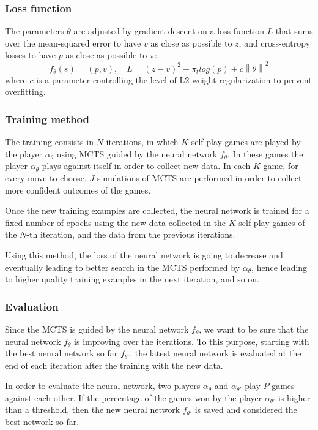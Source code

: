 \documentclass{article}
\newcommand{\norm}[1]{\left\lVert#1\right\rVert}
\begin{document}
\subsubsection{Loss function}
The parameters $\theta$ are adjusted by gradient descent on a loss function $L$ that sums over the mean-squared error to have $v$ as close as possible to $z$, and cross-entropy losses to have $p$ as close as possible to $\pi$:
\begin{equation}\label{eq:loss_function_alphazero}
	f_\theta(s) = (p,v),\quad L = (z-v)^2 - \pi_t log(p) + c \norm{\theta}^2
\end{equation}
where $c$ is a parameter controlling the level of L2 weight regularization to prevent overfitting.

\subsubsection{Training method} \label{sec:training}
The training consists in $N$ iterations, in which $K$ self-play games are played by the player $\alpha_\theta$ using MCTS guided by the neural network $f_\theta$. In these games the player $\alpha_\theta$ plays against itself in order to collect new data. In each $K$ game, for every move to choose, $J$ simulations of MCTS are performed in order to collect more confident outcomes of the games.

Once the new training examples are collected, the neural network is trained for a fixed number of epochs using the new data collected in the $K$ self-play games of the $N$-th iteration, and the data from the previous iterations.

Using this method, the loss of the neural network is going to decrease and eventually leading to better search in the MCTS performed by $\alpha_\theta$, hence leading to higher quality training examples in the next iteration, and so on.

\subsubsection{Evaluation}
Since the MCTS is guided by the neural network $f_\theta$, we want to be sure that the neural network $f_\theta$ is improving over the iterations. To this purpose, starting with the best neural network so far $f_{\theta'}$, the latest neural network is evaluated at the end of each iteration after the training with the new data.

In order to evaluate the neural network, two players $\alpha_\theta$ and $\alpha_{\theta'}$ play $P$ games against each other. If the percentage of the games won by the player $\alpha_{\theta'}$ is higher than a threshold, then the new neural network $f_{\theta'}$ is saved and considered the best network so far.
\end{document}
